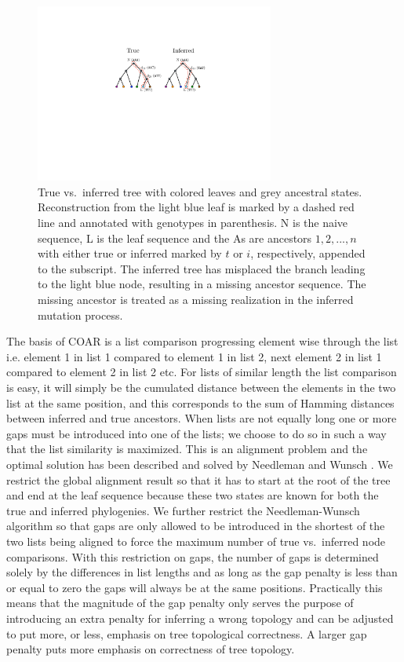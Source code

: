 \begin{figure}[ht!]
    \centering
    \includegraphics[width=0.7\textwidth]{figures/ASR_true_vs_inferred.pdf}
    \caption{
        \label{fig:ASR_true_vs_inferred}
        True vs.\ inferred tree with colored leaves and grey ancestral states. Reconstruction from the light blue leaf is marked by a dashed red line and annotated with genotypes in parenthesis. N is the naive sequence, L is the leaf sequence and the As are ancestors $1,2,...,n$ with either true or inferred marked by $t$ or $i$, respectively, appended to the subscript. The inferred tree has misplaced the branch leading to the light blue node, resulting in a missing ancestor sequence. The missing ancestor is treated as a missing realization in the inferred mutation process.
    }
\end{figure}


The basis of COAR is a list comparison progressing element wise through the list i.e. element 1 in list 1 compared to element 1 in list 2, next element 2 in list 1 compared to element 2 in list 2 etc.
For lists of similar length the list comparison is easy, it will simply be the cumulated distance between the elements in the two list at the same position, and this corresponds to the sum of Hamming distances between inferred and true ancestors.
When lists are not equally long one or more gaps must be introduced into one of the lists; we choose to do so in such a way that the list similarity is maximized.
This is an alignment problem and the optimal solution has been described and solved by Needleman and Wunsch \cite{needleman1970general}.
We restrict the global alignment result so that it has to start at the root of the tree and end at the leaf sequence because these two states are known for both the true and inferred phylogenies.
We further restrict the Needleman-Wunsch algorithm so that gaps are only allowed to be introduced in the shortest of the two lists being aligned to force the maximum number of true vs.\ inferred node comparisons.
With this restriction on gaps, the number of gaps is determined solely by the differences in list lengths and as long as the gap penalty is less than or equal to zero the gaps will always be at the same positions.
Practically this means that the magnitude of the gap penalty only serves the purpose of introducing an extra penalty for inferring a wrong topology and can be adjusted to put more, or less, emphasis on tree topological correctness.
A larger gap penalty puts more emphasis on correctness of tree topology.

